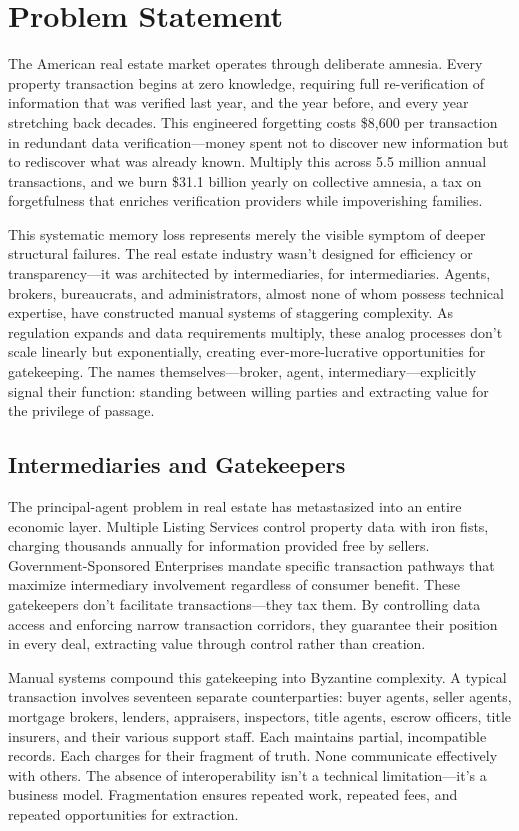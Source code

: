 \chapter{Problem Statement}

The American real estate market operates through deliberate amnesia. Every property transaction begins at zero knowledge, requiring full re-verification of information that was verified last year, and the year before, and every year stretching back decades. This engineered forgetting costs \$8,600 per transaction in redundant data verification—money spent not to discover new information but to rediscover what was already known. Multiply this across 5.5 million annual transactions, and we burn \$31.1 billion yearly on collective amnesia, a tax on forgetfulness that enriches verification providers while impoverishing families.

This systematic memory loss represents merely the visible symptom of deeper structural failures. The real estate industry wasn't designed for efficiency or transparency—it was architected by intermediaries, for intermediaries. Agents, brokers, bureaucrats, and administrators, almost none of whom possess technical expertise, have constructed manual systems of staggering complexity. As regulation expands and data requirements multiply, these analog processes don't scale linearly but exponentially, creating ever-more-lucrative opportunities for gatekeeping. The names themselves—broker, agent, intermediary—explicitly signal their function: standing between willing parties and extracting value for the privilege of passage.

\section{Intermediaries and Gatekeepers}

The principal-agent problem in real estate has metastasized into an entire economic layer. Multiple Listing Services control property data with iron fists, charging thousands annually for information provided free by sellers. Government-Sponsored Enterprises mandate specific transaction pathways that maximize intermediary involvement regardless of consumer benefit. These gatekeepers don't facilitate transactions—they tax them. By controlling data access and enforcing narrow transaction corridors, they guarantee their position in every deal, extracting value through control rather than creation.

Manual systems compound this gatekeeping into Byzantine complexity. A typical transaction involves seventeen separate counterparties: buyer agents, seller agents, mortgage brokers, lenders, appraisers, inspectors, title agents, escrow officers, title insurers, and their various support staff. Each maintains partial, incompatible records. Each charges for their fragment of truth. None communicate effectively with others. The absence of interoperability isn't a technical limitation—it's a business model. Fragmentation ensures repeated work, repeated fees, and repeated opportunities for extraction.

